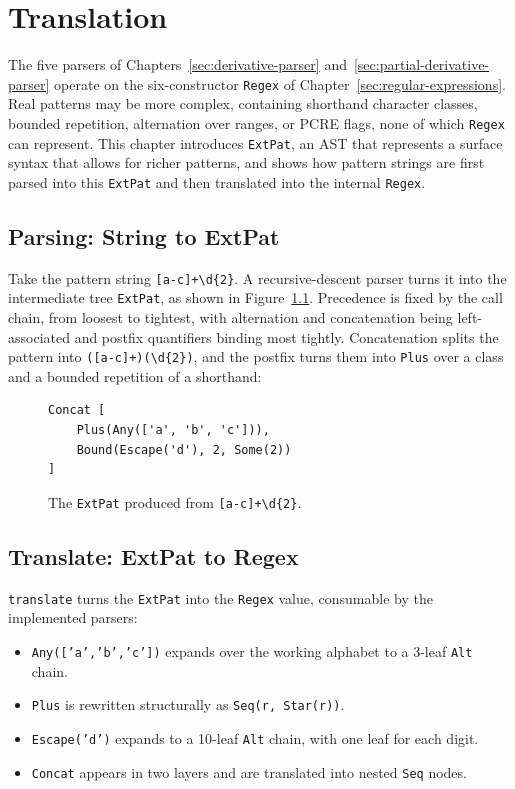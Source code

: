 \chapter{Translation}
\label{sec:frontend}

The five parsers of Chapters~\ref{sec:derivative-parser}
and~\ref{sec:partial-derivative-parser} operate on the
six-constructor \texttt{Regex} of
Chapter~\ref{sec:regular-expressions}. 
Real patterns may be more complex, containing shorthand
character classes, bounded repetition, alternation over ranges,
or PCRE flags, none of which \texttt{Regex} can represent.
This chapter introduces \texttt{ExtPat}, 
an AST that represents a surface syntax that allows
for richer patterns,
and shows how pattern strings are first parsed into this \texttt{ExtPat}
and then translated into the internal \texttt{Regex}.

%
%
%

\section{Parsing: String to ExtPat}
\label{sec:string-to-extpat}

Take the pattern string \verb|[a-c]+\d{2}|. A recursive-descent
parser turns it into the intermediate tree \texttt{ExtPat},
as shown in Figure~\ref{fig:frontend-worked-extpat}. 
Precedence is fixed by the call chain, from loosest to tightest,
with alternation and concatenation being left-associated
and postfix quantifiers binding most tightly.
Concatenation splits the pattern into \texttt{([a-c]+)(\textbackslash d\{2\})}, 
and the postfix turns them into \texttt{Plus} over a class and a
bounded repetition of a shorthand:
\begin{figure}[ht]
\small
\centering
\begin{verbatim}
Concat [
    Plus(Any(['a', 'b', 'c'])),
    Bound(Escape('d'), 2, Some(2))
]
\end{verbatim}
\caption{The \texttt{ExtPat} produced from
\texttt{[a-c]+{\textbackslash}d\{2\}}.}
\label{fig:frontend-worked-extpat}
\end{figure}

%
%
%

\section{Translate: ExtPat to Regex}
\label{sec:extpat-to-regex}

\texttt{translate} turns the \texttt{ExtPat} 
into the \texttt{Regex} value, consumable by the implemented parsers:
\begin{itemize}
  \item \texttt{Any(['a','b','c'])} expands over the working
        alphabet to a 3-leaf \texttt{Alt} chain.
  \item \texttt{Plus} is rewritten structurally as
        \texttt{Seq(r, Star(r))}.
  \item \texttt{Escape('d')} expands to a 10-leaf
        \texttt{Alt} chain, with one leaf for each digit.
  \item \texttt{Concat} appears in two layers and are translated into
        nested \texttt{Seq} nodes.
\end{itemize}


